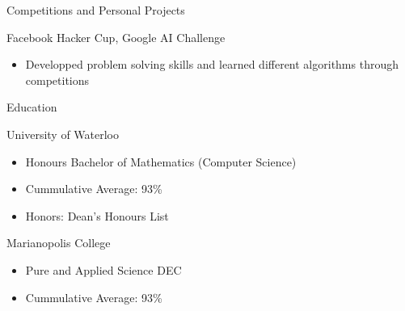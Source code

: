 \documentclass{article}
\newlength{\tabin}
\newlength{\secsep}
\newcommand{\lineunder}{\vspace*{-8pt} \\ \hspace*{-6pt} \hrulefill \\ \vspace*{-15pt}}
\newenvironment{tabbedsection}[1]{
  \begin{list}{}{
      \setlength{\itemsep}{0pt}
      \setlength{\labelsep}{0pt}
      \setlength{\labelwidth}{0pt}
      \setlength{\leftmargin}{\tabin}
      \setlength{\rightmargin}{\tabin}
      \setlength{\listparindent}{0pt}
      \setlength{\parsep}{0pt}
      \setlength{\parskip}{0pt}
      \setlength{\partopsep}{0pt}
      \setlength{\topsep}{#1}
    }
  \item[]
}{\end{list}}
\newenvironment{resume_section}[1]{
  \filbreak
  \vspace{2\secsep}
  \textsc{\large#1}
  \lineunder
  \begin{tabbedsection}{\secsep}
}{\end{tabbedsection}}
\newenvironment{resume_subsection}[2][]{
  \textbf{#2} \hfill {\footnotesize #1} \hspace{2em}
  \begin{tabbedsection}{0.5\secsep}
}{\end{tabbedsection}}
\newenvironment{subitems}{
  \renewcommand{\labelitemi}{-}
  \begin{itemize}
      \setlength{\labelsep}{1em}
}{\end{itemize}}
\begin{document}
\begin{resume_section}{Competitions and Personal Projects}
  \begin{resume_subsection}[(2010--Present)]{Facebook Hacker Cup, Google AI Challenge}
     \begin{subitems}
        \item Developped problem solving skills and learned different algorithms through competitions
    \end{subitems}

  \end{resume_subsection}

  


\end{resume_section}

\begin{resume_section}{Education}
  \begin{resume_subsection}{University of Waterloo}
    \begin{subitems}
      \item Honours Bachelor of Mathematics (Computer Science)
      \item Cummulative Average: 93\%
      \item Honors: Dean's Honours List
    \end{subitems}
  \end{resume_subsection}
  
  
  \begin{resume_subsection}[Westmount, QC (2010--2012)]{Marianopolis College}
    \begin{subitems}
      \item Pure and Applied Science DEC
      \item Cummulative Average: 93\%
     \end{subitems}
  \end{resume_subsection}
\end{resume_section}
\end{document}
